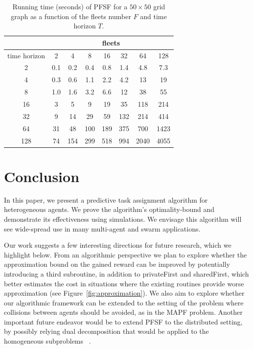 \documentclass[conference]{IEEEtran}
\begin{document}
\begin{table}[]
\centering
\begin{tabular}{c|c|c|c|c|c|c|c|}
\cline{2-8}
                                   & \multicolumn{7}{c|}{fleets}    \\ \hline
\multicolumn{1}{|L||}{time horizon} & 2 & 4 & 8 & 16 & 32 & 64 & 128 \\ \hline \hline
\multicolumn{1}{|c||}{2}            & 0.1 & 0.2 & 0.4 & 0.8 & 1.4 & 4.8 & 7.3  \\ \hline
\multicolumn{1}{|c||}{4}            & 0.3 & 0.6 & 1.1 & 2.2 & 4.2 & 13 & 19  \\ \hline
\multicolumn{1}{|c||}{8}            &  1.0 & 1.6 & 3.2 & 6.6 & 12 & 38 & 55  \\ \hline
\multicolumn{1}{|c||}{16}           &  3 & 5 & 9 & 19 & 35 & 118 & 214   \\ \hline
\multicolumn{1}{|c||}{32}           &   9 & 14 & 29 & 59 & 132 & 214 & 414  \\ \hline
\multicolumn{1}{|c||}{64}           &   31 & 48 & 100 & 189 & 375 & 700 & 1423  \\ \hline
\multicolumn{1}{|c||}{128}          &  74 & 154 & 299 & 518 & 994 & 2040 & 4055   \\ \hline
\end{tabular}
\vspace{5pt}
\caption{Running time (seconds) of PFSF for a $50\times 50$ grid graph as a function of the fleets number $F$ and time horizon $T$. \label{tbl:pfsf}}
\end{table}

\section{Conclusion}\label{sec:future}
In this paper, we present a predictive task assignment algorithm for heterogeneous agents. We prove the algorithm's optimality-bound and demonstrate its effectiveness using simulations. We envisage this algorithm will see wide-spread use in many multi-agent and swarm applications. 

Our work suggests a few interesting directions for future research, which we highlight below. From an algorithmic perspective we plan to explore whether the approximation bound on the gained reward can be improved by potentially introducing a third subroutine, in addition to privateFirst and sharedFirst, which better estimates the cost in situations where the existing routines provide worse approximation (see Figure~\ref{fig:approximation}). We also aim to explore whether our algorithmic framework can be extended to the setting of the problem where collisions between agents should be avoided, as in the MAPF problem. Another important future endeavor would be to extend PFSF to the distributed setting, by possibly relying dual decomposition that would be applied to the homogeneous subproblems ~\cite[Chapter~7]{Ref:Bertsekas2016Nonlinear}.
\end{document}
